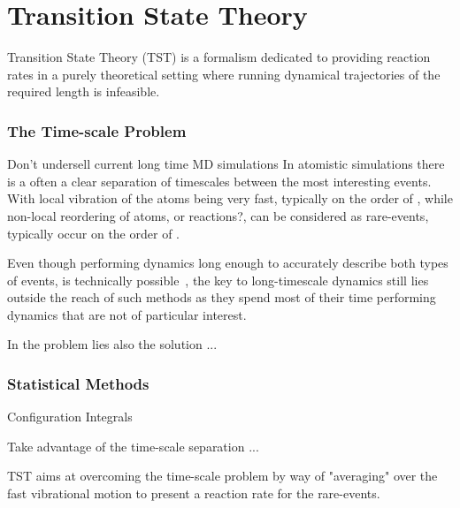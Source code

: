 \section{Transition State Theory}
\label{sec:tst}

Transition State Theory (TST) is a formalism dedicated to providing reaction rates in a purely theoretical setting where running dynamical trajectories of the required length is infeasible.

\recent

\incomplete

\subsubsection{The Time-scale Problem}
\bit
\item Don't undersell current long time MD simulations
\eit
{}
In atomistic simulations there is a often a clear separation of timescales between the most interesting events.
With local vibration of the atoms being very fast, typically on the order of \missing,
while non-local reordering of atoms, or reactions?, can be considered as rare-events, typically occur on the order of \missing.

Even though performing dynamics long enough to accurately describe both types of events, is technically possible~\citemiss, the key to long-timescale dynamics still lies outside the reach of such methods as they spend most of their time performing dynamics that are not of particular interest.

In the problem lies also the solution ...

\recent

\incomplete

\subsubsection{Statistical Methods}

\bit
\item Configuration Integrals
\eit

Take advantage of the time-scale separation ...

TST aims at overcoming the time-scale problem by way of "averaging" over the fast vibrational motion to present a reaction rate for the rare-events.

